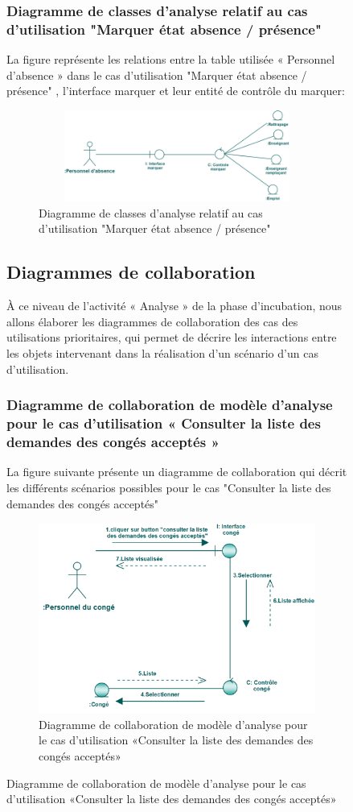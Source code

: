\documentclass[12 pt]{report}
\begin{document}
\begin{figure}[h]
\begin{center}
\subsubsection{Diagramme de classes d’analyse relatif au cas d’utilisation "Marquer état absence / présence" }
La figure  représente les relations entre la table utilisée « Personnel d'absence » dans le cas d’utilisation  "Marquer état absence / présence" , l’interface  marquer et  leur entité de  contrôle du marquer:
\begin{figure}[h]
\begin{center}
\includegraphics[width= 12cm , height =3cm]{cla_mar_abs.png}
\caption{Diagramme de classes d’analyse relatif au cas d’utilisation "Marquer état absence / présence"}
\end{center}
\end{figure}
\subsection{Diagrammes de collaboration }
 À ce niveau de l’activité « Analyse » de la phase d’incubation, nous allons élaborer les diagrammes de collaboration des cas des utilisations prioritaires, qui permet de décrire les interactions entre les
objets intervenant dans la réalisation d’un scénario d’un cas d’utilisation.
\subsubsection{Diagramme  de  collaboration  de  modèle  d'analyse  pour  le  cas  d'utilisation « Consulter la liste des demandes des congés acceptés »  }
La figure suivante présente un diagramme de collaboration qui décrit les différents
scénarios possibles pour le cas "Consulter la liste des demandes des congés acceptés"
\begin{figure}[h]
\begin{center}
\includegraphics[width= 14 cm , height =5 cm]{colla_con_con_acc.PNG}
 \caption{Diagramme  de  collaboration  de  modèle  d'analyse  pour  le  cas  d'utilisation «Consulter la liste des demandes des congés acceptés»}
\end{center}
\end{figure} 

\end{center}
\end{figure}
\end{document}
